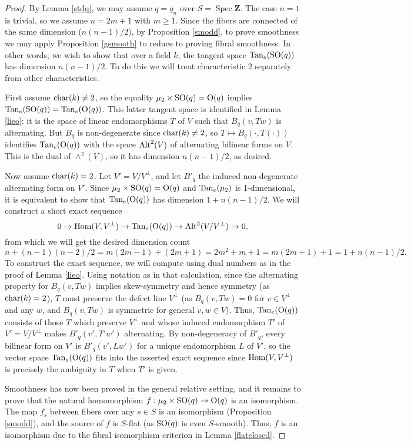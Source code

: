 \documentclass[10pt]{article}
\newcommand{\Hom}{\operatorname{Hom}}
\renewcommand{\(}{\left(}
\renewcommand{\)}{\right)}
\newcommand{\Spec}{\operatorname{Spec}}
\numberwithin{thm}{subsection}
\begin{document}
\begin{proof}
By Lemma \ref{stdq}, we may assume $q = q_n$ over $S = \Spec {\mathbf{Z}}$.
The case $n = 1$ is trivial, so we assume $n = 2m + 1$ with $m \ge 1$.
Since the fibers are connected of the same dimension ($n(n-1)/2$),
by Proposition \ref{smodd}, to prove smoothness  we may apply 
Proposition \ref{gsmooth} to reduce to proving
fibral smoothness.  In other words, we wish to show
that over a field $k$, the tangent space
${\rm{Tan}}_e({\rm{SO}}(q))$ has dimension $n(n-1)/2$.
To do this we will treat characteristic 2 separately
from other characteristics. 

First assume ${\rm{char}}(k) \ne 2$, so the equality 
$\mu_2 \times {\rm{SO}}(q) = {\rm{O}}(q)$ implies
${\rm{Tan}}_e({\rm{SO}}(q)) = 
{\rm{Tan}}_e({\rm{O}}(q))$.   This latter tangent space
is identified in Lemma \ref{lieo}: it is the space
of linear endomorphisms $T$ of $V$ such that $B_q(v,Tw)$
is alternating.  But $B_q$ is non-degenerate
since ${\rm{char}}(k) \ne 2$, so $T \mapsto B_q(\cdot, T(\cdot))$
identifies ${\rm{Tan}}_e({\rm{O}}(q))$
with the space ${\rm{Alt}}^2(V)$ of alternating bilinear forms on $V$.
This is the dual of $\wedge^2(V)$, so it has dimension $n(n-1)/2$,
as desired.

Now assume ${\rm{char}}(k) = 2$.  Let $V' = V/V^{\perp}$,
and let $B'_q$ the induced non-degenerate
alternating form on $V'$.  Since
$\mu_2 \times {\rm{SO}}(q) = {\rm{O}}(q)$ 
and ${\rm{Tan}}_e(\mu_2)$ is 1-dimensional, 
it is equivalent to show that ${\rm{Tan}}_e({\rm{O}}(q))$
has dimension $1 + n(n-1)/2$.  We will construct a short exact sequence
$$0 \rightarrow \Hom(V,V^{\perp}) \rightarrow
{\rm{Tan}}_e({\rm{O}}(q)) \rightarrow {\rm{Alt}}^2(V/V^{\perp}) \rightarrow 0,$$
from which we will get the desired dimension count
$$n + (n-1)(n-2)/2 = m(2m-1) + (2m+1) = 2m^2 + m + 1 = m(2m+1)+1 = 1 + n(n-1)/2.$$
To construct the exact sequence, we will compute using dual numbers as in
the proof of Lemma \ref{lieo}.  
Using notation as in that calculation, since the alternating property
for $B_q(v,Tw)$ implies skew-symmetry
and hence symmetry (as ${\rm{char}}(k) = 2$), $T$ must preserve the defect line 
$V^{\perp}$ (as $B_q(v,Tw) = 0$ for $v \in V^{\perp}$ and any $w$, and
$B_q(v,Tw)$ is symmetric for general $v, w \in V$).
Thus, ${\rm{Tan}}_e({\rm{O}}(q))$ consists of
those $T$ which preserve $V^{\perp}$ and whose induced
endomorphism $T'$ of $V' = V/V^{\perp}$ makes $B'_q(v',T'w')$ alternating.
By non-degeneracy of $B'_q$, every bilinear form on
$V'$ is $B'_q(v',Lw')$ for a unique endomorphism $L$ of $V'$, 
so the vector space ${\rm{Tan}}_e({\rm{O}}(q))$ fits into the asserted exact sequence
since ${\rm{Hom}}(V,V^{\perp})$ is precisely the ambiguity in $T$ when $T'$ is given.

Smoothness has now been proved in the general relative setting,
and it remains to prove that the natural homomorphism
$f:\mu_2 \times {\rm{SO}}(q) \rightarrow {\rm{O}}(q)$
is an isomorphism.  The map $f_s$ between fibers over any $s \in S$ is
an isomorphism (Proposition \ref{smodd}),
and the source of $f$ is $S$-flat (as ${\rm{SO}}(q)$ is even $S$-smooth).
Thus, $f$ is an isomorphism due to the fibral
isomorphism criterion in Lemma \ref{flatclosed}.
\end{proof}
\end{document}
